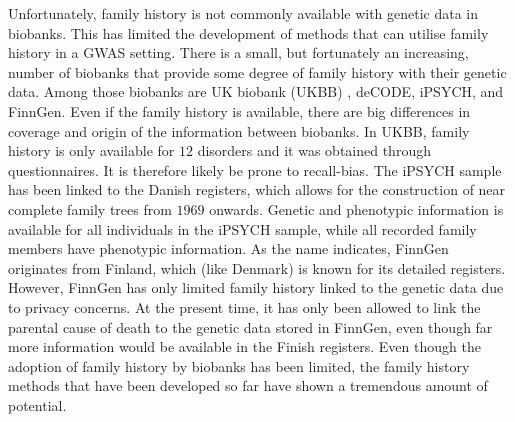 Unfortunately, family history is not commonly available with genetic data in biobanks. This has limited the development of methods that can utilise family history in a GWAS setting. There is a small, but fortunately an increasing, number of biobanks that provide some degree of family history with their genetic data. Among those biobanks are UK biobank (UKBB) \cite{bycroft2018uk}, deCODE\cite{noauthor_2012-jh}, iPSYCH\cite{bybjerg2020ipsych2015}, and FinnGen\cite{Kurki2022-pt}. Even if the family history is available, there are big differences in coverage and origin of the information between biobanks. In UKBB, family history is only available for $ 12 $ disorders and it was obtained through questionnaires. It is therefore likely be prone to recall-bias. The iPSYCH sample has been linked to the Danish registers, which allows for the construction of near complete family trees from $ 1969 $ onwards. Genetic and phenotypic information is available for all individuals in the iPSYCH sample, while all recorded family members have phenotypic information. As the name indicates, FinnGen originates from Finland, which (like Denmark) is known for its detailed registers. However, FinnGen has only limited family history linked to the genetic data due to privacy concerns. At the present time, it has only been allowed to link the parental cause of death to the genetic data stored in FinnGen, even though far more information would be available in the Finish registers. Even though the adoption of family history by biobanks has been limited, the family history methods that have been developed so far have shown a tremendous amount of potential. 

